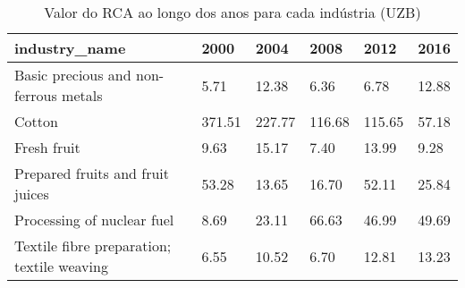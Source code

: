 \begin{table}
\centering
\caption{Valor do RCA ao longo dos anos para cada indústria (UZB)}
\begin{tabular}{p{6cm}p{1.5cm}p{1.5cm}p{1.5cm}p{1.5cm}p{1.5cm}}
\toprule
                             industry\_name &   2000 &   2004 &   2008 &   2012 &  2016 \\
\midrule
     Basic precious and non-ferrous metals &   5.71 &  12.38 &   6.36 &   6.78 & 12.88 \\
                                    Cotton & 371.51 & 227.77 & 116.68 & 115.65 & 57.18 \\
                               Fresh fruit &   9.63 &  15.17 &   7.40 &  13.99 &  9.28 \\
          Prepared fruits and fruit juices &  53.28 &  13.65 &  16.70 &  52.11 & 25.84 \\
                Processing of nuclear fuel &   8.69 &  23.11 &  66.63 &  46.99 & 49.69 \\
Textile fibre preparation; textile weaving &   6.55 &  10.52 &   6.70 &  12.81 & 13.23 \\
\bottomrule
\end{tabular}
\end{table}
